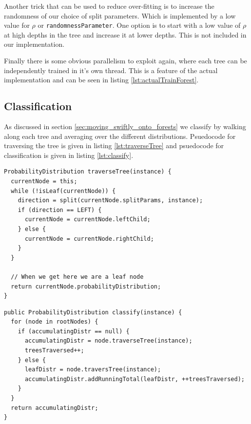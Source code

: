 \documentclass[12pt,twoside,notitlepage]{report}
\begin{document}
          Another trick that can be used to reduce over-fitting is to increase the randomness of our choice of 
          split parameters. Which is implemented by a low value for $\rho$ or \texttt{randomnessParameter}. One option 
          is to start with a low value of $\rho$ at high depths in the tree and increase it at lower depths. This is 
          not included in our implementation.

          Finally there is some obvious parallelism to exploit again, where each tree can be independently trained 
          in it's own thread. This is a feature of the actual implementation and can be seen in listing 
          \ref{lst:actualTrainForest}.






      \subsection{Classification} \label{sec:classification}
          As discussed in section \ref{sec:moving_swiftly_onto_forests} we classify by walking along each tree and 
          averaging over the different distributions. Psuedocode for traversing the tree is given in listing 
          \ref{lst:traverseTree} and psuedocode for classification is given in listing \ref{lst:classify}.

          \begin{lstlisting}[float=tp,caption={Psuedocode for traversing a decision tree.}, label={lst:traverseTree}]
ProbabilityDistribution traverseTree(instance) {
  currentNode = this;
  while (!isLeaf(currentNode)) {
    direction = split(currentNode.splitParams, instance);
    if (direction == LEFT) {
      currentNode = currentNode.leftChild;
    } else {
      currentNode = currentNode.rightChild;
    }
  }

  // When we get here we are a leaf node
  return currentNode.probabilityDistribution;
}
          \end{lstlisting}

          \begin{lstlisting}[float=tp,caption={Psuedocode for classification using a decision tree.}, label={lst:classify}]
public ProbabilityDistribution classify(instance) {
  for (node in rootNodes) {
    if (accumulatingDistr == null) {
      accumulatingDistr = node.traverseTree(instance);
      treesTraversed++;
    } else {
      leafDistr = node.traversTree(instance);
      accumulatingDistr.addRunningTotal(leafDistr, ++treesTraversed);
    }
  }
  return accumulatingDistr;
}
          \end{lstlisting}
\end{document}
